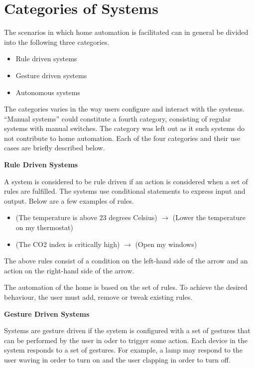 \section{Categories of Systems}\label{sec:categories-of-systems}

The scenarios in which home automation is facilitated can in general be divided into the following three categories.

\begin{itemize}
\item Rule driven systems
\item Gesture driven systems
\item Autonomous systems
\end{itemize}

The categories varies in the way users configure and interact with the systems. ``Manual systems'' could constitute a fourth category, consisting of regular systems with manual switches. The category was left out as it such systems do not contribute to home automation.
Each of the four categories and their use cases are briefly described below.

\textbf{Rule Driven Systems}

A system is considered to be rule driven if an action is considered when a set of rules are  fulfilled. The systems use conditional statements to express input and output. Below are a few examples of rules.

\begin{itemize}
\item (The temperature is above 23 degrees Celsius) $\rightarrow$ (Lower the temperature on my thermostat)
\item (The CO2 index is critically high) $\rightarrow$ (Open my windows)
\end{itemize}

The above rules consist of a condition on the left-hand side of the arrow and an action on the right-hand side of the arrow.

The automation of the home is based on the set of rules. To achieve the desired behaviour, the user must add, remove or tweak existing rules.

\textbf{Gesture Driven Systems}

Systems are gesture driven if the system is configured with a set of gestures that can be performed by the user in oder to trigger some action. Each device in the system responds to a set of gestures. For example, a lamp may respond to the user waving in order to turn on and the user clapping in order to turn off.

